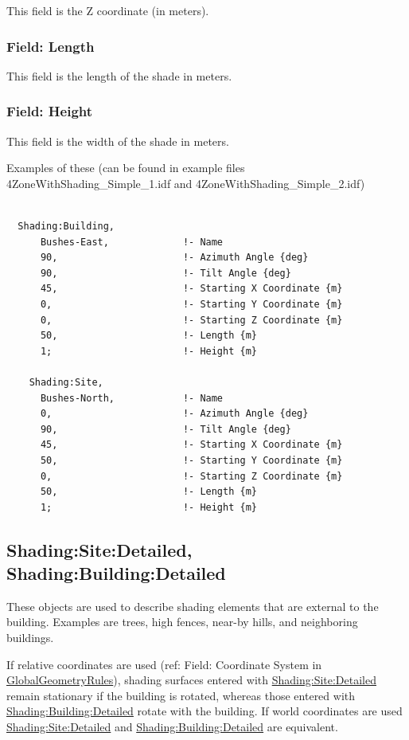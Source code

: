 This field is the Z coordinate (in meters).

\subsubsection{Field: Length}\label{field-length-16}

This field is the length of the shade in meters.

\subsubsection{Field: Height}\label{field-height-10}

This field is the width of the shade in meters.

Examples of these (can be found in example files 4ZoneWithShading\_Simple\_1.idf and 4ZoneWithShading\_Simple\_2.idf)

\begin{lstlisting}

  Shading:Building,
      Bushes-East,             !- Name
      90,                      !- Azimuth Angle {deg}
      90,                      !- Tilt Angle {deg}
      45,                      !- Starting X Coordinate {m}
      0,                       !- Starting Y Coordinate {m}
      0,                       !- Starting Z Coordinate {m}
      50,                      !- Length {m}
      1;                       !- Height {m}

    Shading:Site,
      Bushes-North,            !- Name
      0,                       !- Azimuth Angle {deg}
      90,                      !- Tilt Angle {deg}
      45,                      !- Starting X Coordinate {m}
      50,                      !- Starting Y Coordinate {m}
      0,                       !- Starting Z Coordinate {m}
      50,                      !- Length {m}
      1;                       !- Height {m}
\end{lstlisting}

\subsection{Shading:Site:Detailed, Shading:Building:Detailed}\label{shadingsitedetailed-shadingbuildingdetailed}

These objects are used to describe shading elements that are external to the building. Examples are trees, high fences, near-by hills, and neighboring buildings.

If relative coordinates are used (ref: Field: Coordinate System in \hyperref[globalgeometryrules]{GlobalGeometryRules}), shading surfaces entered with \hyperref[shadingsitedetailed-shadingbuildingdetailed]{Shading:Site:Detailed} remain stationary if the building is rotated, whereas those entered with \hyperref[shadingsitedetailed-shadingbuildingdetailed]{Shading:Building:Detailed} rotate with the building. If world coordinates are used \hyperref[shadingsitedetailed-shadingbuildingdetailed]{Shading:Site:Detailed} and \hyperref[shadingsitedetailed-shadingbuildingdetailed]{Shading:Building:Detailed} are equivalent.

